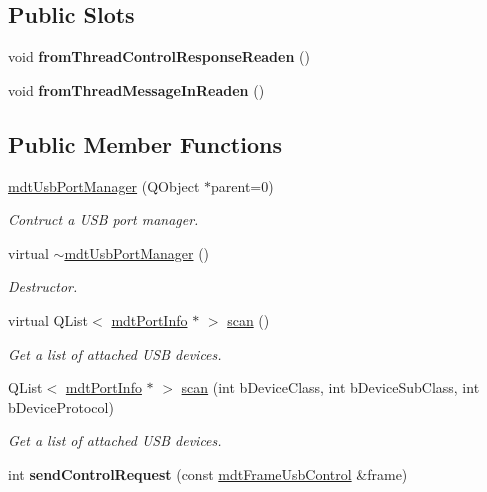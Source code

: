 \subsection*{Public Slots}
\begin{DoxyCompactItemize}
\item 
\hypertarget{classmdt_usb_port_manager_af043c75c74665b23d13f3cb73150935c}{
void {\bfseries fromThreadControlResponseReaden} ()}
\label{classmdt_usb_port_manager_af043c75c74665b23d13f3cb73150935c}

\item 
\hypertarget{classmdt_usb_port_manager_a9b7154590a4eb267aff4e11ba53dd7aa}{
void {\bfseries fromThreadMessageInReaden} ()}
\label{classmdt_usb_port_manager_a9b7154590a4eb267aff4e11ba53dd7aa}

\end{DoxyCompactItemize}
\subsection*{Public Member Functions}
\begin{DoxyCompactItemize}
\item 
\hyperlink{classmdt_usb_port_manager_a7f82574e84d0a99d1c8bef7fd79283e3}{mdtUsbPortManager} (QObject $\ast$parent=0)
\begin{DoxyCompactList}\small\item\em Contruct a USB port manager. \end{DoxyCompactList}\item 
virtual \hyperlink{classmdt_usb_port_manager_ac0da1cf62e664b78fe91b873da5835ce}{$\sim$mdtUsbPortManager} ()
\begin{DoxyCompactList}\small\item\em Destructor. \end{DoxyCompactList}\item 
virtual QList$<$ \hyperlink{classmdt_port_info}{mdtPortInfo} $\ast$ $>$ \hyperlink{classmdt_usb_port_manager_a3a2370c3a2d0353a880bf9b777728c3b}{scan} ()
\begin{DoxyCompactList}\small\item\em Get a list of attached USB devices. \end{DoxyCompactList}\item 
QList$<$ \hyperlink{classmdt_port_info}{mdtPortInfo} $\ast$ $>$ \hyperlink{classmdt_usb_port_manager_ab28253c46c80bb12cbbd116b05c4bcd3}{scan} (int bDeviceClass, int bDeviceSubClass, int bDeviceProtocol)
\begin{DoxyCompactList}\small\item\em Get a list of attached USB devices. \end{DoxyCompactList}\item 
\hypertarget{classmdt_usb_port_manager_a380e25af521b2ffeab1b983162046d48}{
int {\bfseries sendControlRequest} (const \hyperlink{classmdt_frame_usb_control}{mdtFrameUsbControl} \&frame)}
\label{classmdt_usb_port_manager_a380e25af521b2ffeab1b983162046d48}

\end{DoxyCompactItemize}


